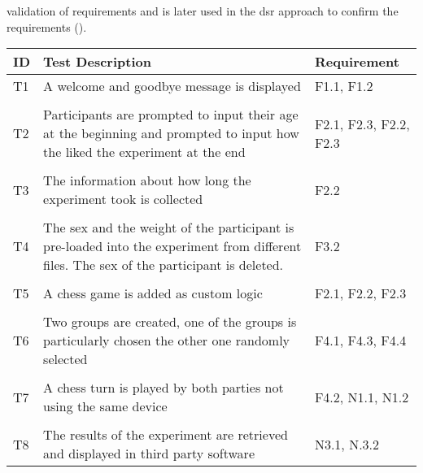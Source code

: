 validation of requirements and is later used in the \ac{dsr} approach to confirm the requirements (\cite{Sommerville.2011}).

\begin{table}[htbp]
    \centering
    \small
    \begin{tabular}{L{0.04\textwidth}L{0.7\textwidth}L{0.15\textwidth}}
    \hline
    ID  & Test Description                                                                                                                                     & Requirement                  \\ \hline
    T1  & A welcome and goodbye message is displayed                                                                                               & F1.1, F1.2                 \\
    & \\
    T2  & Participants are prompted to input their age at the beginning and prompted to input how the liked the experiment at the end              & F2.1, F2.3, F2.2, F2.3 \\
    & \\
    T3  & The information about how long the experiment took is collected                                                                          & F2.2                         \\
    & \\
    T4  & The sex and the weight of the participant is pre-loaded into the experiment from different files. The sex of the participant is deleted. & F3.2                         \\
    & \\
    T5  & A chess game is added as custom logic                                                                                                    & F2.1, F2.2, F2.3         \\
    & \\
    T6  & Two groups are created, one of the groups is particularly chosen the other one randomly selected                                           & F4.1, F4.3, F4.4         \\
    & \\
    T7  & A chess turn is played by both parties not using the same device                                                                         & F4.2, N1.1, N1.2         \\
    & \\
    T8  & The results of the experiment are retrieved and displayed in third party software                                                        & N3.1, N.3.2                \\

\end{tabular}
\end{table}

